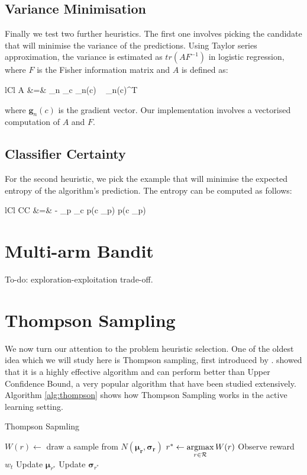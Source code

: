 \subsection{Variance Minimisation}
Finally we test two further heuristics. The first one involves picking the candidate that will minimise the variance of the predictions. Using Taylor series approximation, the variance is estimated as $tr(AF^{-1})$ in logistic regression, where $F$ is the Fisher information matrix and $A$ is defined as:
	\begin{IEEEeqnarray*}{lCl}
		A &=& \sum_n \sum_c _n(c) ~ _n(c)^T
	\end{IEEEeqnarray*}
where $\mathbf{g}_n(c)$ is the gradient vector. Our implementation involves a vectorised computation of $A$ and $F$.


\subsection{Classifier Certainty}
For the second heuristic, we pick the example that will minimise the expected entropy of the algorithm's prediction. The entropy can be computed as follows:
	\begin{IEEEeqnarray*}{lCl}
		CC &=& - \sum_{p \in {}} \sum_c p(c \mid {}_p) \log p(c \mid {}_p)
	\end{IEEEeqnarray*}
	


\section{Multi-arm Bandit}
To-do: exploration-exploitation trade-off.

\section{Thompson Sampling}
We now turn our attention to the problem heuristic selection.
 One of the oldest idea which we will
study here is Thompson sampling, first introduced by .
 showed that it is a highly effective algorithm and can perform better
than Upper Confidence Bound, a very popular algorithm that have been studied extensively.
Algorithm \ref{alg:thompson} shows how Thompson Sampling works in the active learning
setting.

\begin{algorithm}[tbp]
	\caption{Thompson Sapmling}
	\label{alg:thompson}
	\begin{algorithmic}[1]
				\State $W(r) \leftarrow$ draw a sample from $N(\bm{\mu_r}, \bm{\sigma_r})$
			\Endforeach
			\State $r^* \leftarrow \argmax_{r \in \R} W(r)$
			\State Observe reward $w_t$
			\State Update $\bm{\mu}_{r^*}$
			\State Update $\bm{\sigma}_{r^*}$
		\Endforeach
		\EndProcedure
	\end{algorithmic}
\end{algorithm}

